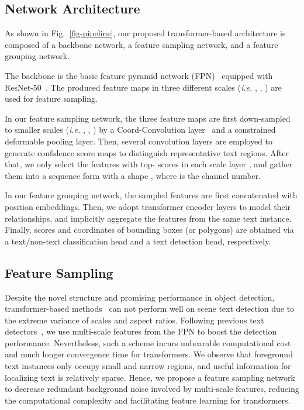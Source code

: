 \documentclass[10pt,twocolumn,letterpaper]{article}
\begin{document}
\subsection{Network Architecture}

As shown in Fig.~\ref{fig-pipeline}, our proposed transformer-based architecture is composed of a backbone network, a feature sampling network, and a feature grouping network.

The backbone is the basic feature pyramid network (FPN)~\cite{FPN} equipped with ResNet-50~\cite{ResNet}.
The produced feature maps  in three different scales (\emph{i.e.} , , ) are used for feature sampling.

In our feature sampling network, the three feature maps are first down-sampled to smaller scales (\emph{i.e.} , , ) by a Coord-Convolution layer~\cite{Coord} and a constrained deformable pooling layer.
Then, several convolution layers are employed to generate confidence score maps to distinguish representative text regions.
After that, we only select the features with top- scores in each scale layer , and gather them into a sequence form with a shape , where  is the channel number.

In our feature grouping network, the sampled features are first concatenated with position embeddings.
Then, we adopt transformer encoder layers to model their relationships, and implicitly aggregate the features from the same text instance.
Finally, scores and coordinates of bounding boxes (or polygons) are obtained via a text/non-text classification head and a text detection head, respectively.

\subsection{Feature Sampling}
Despite the novel structure and promising performance in object detection, transformer-based methods~\cite{carion2020detr,raisi2021transformer} can not perform well on scene text detection due to the extreme variance of scales and aspect ratios.
Following previous text detectors~\cite{DB, PSE-Net, FPN, masktextspotterv3}, we use multi-scale features from the FPN to boost the detection performance.
Nevertheless, such a scheme incurs unbearable computational cost and much longer convergence time for transformers. We observe that foreground text instances only occupy small and narrow regions, and useful information for localizing text is relatively sparse.
Hence, we propose a feature sampling network to decrease redundant background noise involved by multi-scale features, reducing the computational complexity and facilitating feature learning for transformers.
\end{document}
